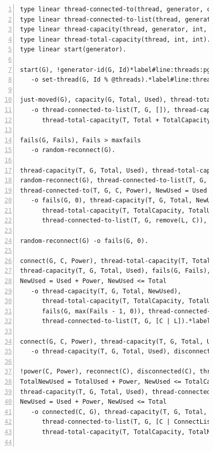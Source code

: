 \begin{figure}[h!]
\begin{Verbatim}[numbers=left,fontsize=\scriptsize,commandchars=*\#\&]
type linear thread-connected-to(thread, generator, consumer, int).*hfill// Predicate declaration
type linear thread-connected-to-list(thread, generator, list consumer).
type linear thread-capacity(thread, generator, int, int).
type linear thread-total-capacity(thread, int, int).
type linear start(generator).

start(G), !generator-id(G, Id)*label#line:threads:pgt_start1&
   -o set-thread(G, Id % @threads).*label#line:threads:pgt_start2&

just-moved(G), capacity(G, Total, Used), thread-total-capacity(T, TotalCapacity, TotalUsed)*label#line:threads:pgt_moved1&
   -o thread-connected-to-list(T, G, []), thread-capacity(T, G, Total, Used),
      thread-total-capacity(T, Total + TotalCapacity, Used + TotalUsed).*label#line:threads:pgt_moved2&

fails(G, Fails), Fails > maxfails
   -o random-reconnect(G).

thread-capacity(T, G, Total, Used), thread-total-capacity(T, TotalCapacity, TotalUsed),
random-reconnect(G), thread-connected-to-list(T, G, L), L <> [], C = nth(L, randint(length(L))),
thread-connected-to(T, G, C, Power), NewUsed = Used - Power
   -o fails(G, 0), thread-capacity(T, G, Total, NewUsed),
      thread-total-capacity(T, TotalCapacity, TotalUsed - Power),
      thread-connected-to-list(T, G, remove(L, C)), disconnect(C, G).

random-reconnect(G) -o fails(G, 0).

connect(G, C, Power), thread-total-capacity(T, TotalCapacity, TotalUsed),*label#line:threads:pgt_gen1&
thread-capacity(T, G, Total, Used), fails(G, Fails), thread-connected-to-list(T, G, L),
NewUsed = Used + Power, NewUsed <= Total
   -o thread-capacity(T, G, Total, NewUsed),
      thread-total-capacity(T, TotalCapacity, TotalUsed + Power),
      fails(G, max(Fails - 1, 0)), thread-connected-to(T, G, C, Power),
      thread-connected-to-list(T, G, [C | L]).*label#line:threads:pgt_gen11&

connect(G, C, Power), thread-capacity(T, G, Total, Used), Used + Power > Total, fails(G, Fails)
   -o thread-capacity(T, G, Total, Used), disconnect(C, G), fails(G, Fails + 1).*label#line:threads:pgt_gen2&

!power(C, Power), reconnect(C), disconnected(C), thread-total-capacity(T, TotalCapacity, TotalUsed),*label#line:threads:pgt_con1&
TotalNewUsed = TotalUsed + Power, NewUsed <= TotalCapacity,
thread-capacity(T, G, Total, Used), thread-connected-to-list(T, G, ConnectList),
NewUsed = Used + Power, NewUsed <= Total
   -o connected(C, G), thread-capacity(T, G, Total, NewUsed),
      thread-connected-to-list(T, G, [C | ConnectList]), thread-connected-to(T, G, C, Power),
      thread-total-capacity(T, TotalCapacity, TotalNewUsed).*label#line:threads:pgt_con2&


\end{Verbatim}
\end{figure}
